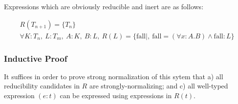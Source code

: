 \documentclass[11pt]{article}
\begin{document}
Expressions which are obviously reducible and inert are as follows:

\begin{gather*}
R(T_{n + 1}) = \{ T_{n} \}\ \\
\forall K : T_{n},\ L : T_{m},\ A : K,\ B : L,\ R(L) = \{ \text{fall} \mid ,\ \text{fall} = (\forall x : A.B) \land \text{fall} : L \}
\end{gather*}
\subsubsection{Inductive Proof}
\label{sec:orgde08659}

It suffices in order to prove strong normalization of this sytem that a) all reducibility candidates in \(R\) are strongly-normalizing; and c) all well-typed expression \((e : t)\) can be expressed using expressions in \(R(t)\).
\end{document}
